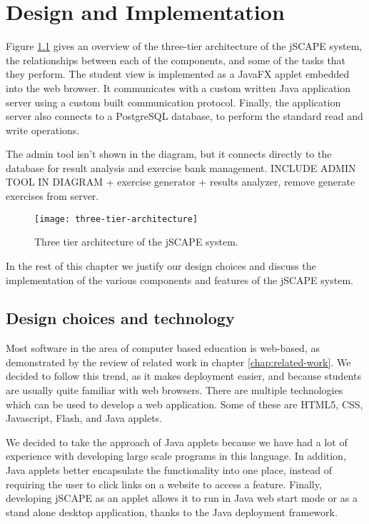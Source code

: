 \chapter{Design and Implementation}
\label{chap:implementation}
Figure \ref{fig:three-tier-architecture} gives an overview of the three-tier architecture of the jSCAPE system, the relationships between each of the components, and some of the tasks that they perform. The student view is implemented as a JavaFX applet embedded into the web browser. It communicates with a custom written Java application server using a custom built communication protocol. Finally, the application server also connects to a PostgreSQL database, to perform the standard read and write operations. \newline

The admin tool isn't shown in the diagram, but it connects directly to the database for result analysis and exercise bank management. INCLUDE ADMIN TOOL IN DIAGRAM + exercise generator + results analyzer, remove generate exercises from server.

\begin{figure}[H]
\centering
\texttt{[image: three-tier-architecture]}
\caption{Three tier architecture of the jSCAPE system.}
\label{fig:three-tier-architecture}
\end{figure}

In the rest of this chapter we justify our design choices and discuss the implementation of the various components and features of the jSCAPE system.

\section{Design choices and technology}
Most software in the area of computer based education is web-based, as demonstrated by the review of related work in chapter \ref{chap:related-work}. We decided to follow this trend, as it makes deployment easier, and because students are usually quite familiar with web browsers. There are multiple technologies which can be used to develop a web application. Some of these are HTML5, CSS, Javascript, Flash, and Java applets.\newline

We decided to take the approach of Java applets because we have had a lot of experience with developing large scale programs in this language. In addition, Java applets better encapsulate the functionality into one place, instead of requiring the user to click links on a website to access a feature. Finally, developing jSCAPE as an applet allows it to run in Java web start mode or as a stand alone desktop application, thanks to the Java deployment framework. \newline


